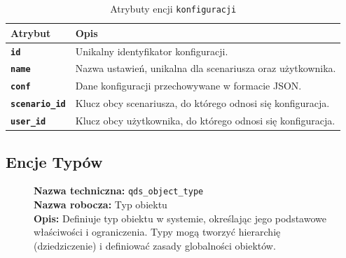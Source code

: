 \begin{table}[H]
    \centering
    \renewcommand{\arraystretch}{1.6}
    \begin{tabular}{|>{\bfseries}l|p{}|}
        \hline
        \rowcolor[HTML]{EFEFEF} \textbf{Atrybut} & \textbf{Opis} \\
        \hline
        \texttt{id} & Unikalny identyfikator konfiguracji. \\
        \hline
        \texttt{name} & Nazwa ustawień, unikalna dla scenariusza oraz użytkownika. \\
        \hline
        \texttt{conf} & Dane konfiguracji przechowywane w formacie JSON. \\
        \hline
        \texttt{scenario\_id} & Klucz obcy scenariusza, do którego odnosi się konfiguracja. \\
        \hline
        \texttt{user\_id} & Klucz obcy użytkownika, do którego odnosi się konfiguracja. \\
        \hline
    \end{tabular}
    \caption{Atrybuty encji \texttt{konfiguracji}}
\end{table}

\subsection{Encje Typów}

\begin{figure}[H]
    \centering
    \begin{minipage}{0.8\textwidth}
        \begin{framed}
            \noindent\textbf{\large Nazwa techniczna:} \texttt{qds\_object\_type} \\
            \textbf{\large Nazwa robocza:} Typ obiektu \\
            \textbf{\large Opis:} Definiuje typ obiektu w systemie, określając jego podstawowe właściwości
            i ograniczenia. Typy mogą tworzyć hierarchię (dziedziczenie) i definiować zasady globalności obiektów.
        \end{framed}
    \end{minipage}
\end{figure}

